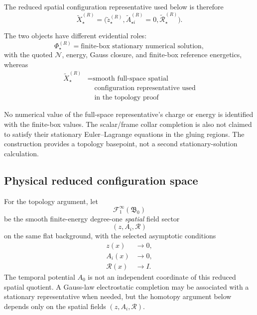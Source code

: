 \documentclass[11pt]{article}
\begin{document}
The reduced spatial configuration representative used below is therefore
\begin{equation}
\boxed{
\widetilde X_\star^{(R)}
=
\bigl(
\widetilde z_\star^{(R)},
\widetilde A_{\star i}^{(R)}=0,
\widetilde{\mathcal R}_\star^{(R)}
\bigr).
}
\end{equation}

The two objects have different evidential roles:
\begin{equation}
\boxed{
\Phi_\star^{(R)}
=
\text{finite-box stationary numerical solution},
}
\end{equation}
with the quoted \(\mathcal N\), energy, Gauss closure, and finite-box reference energetics, whereas
\begin{equation}
\boxed{
\begin{aligned}
\widetilde X_\star^{(R)}
&=\text{smooth full-space spatial}
\\
&\quad\text{configuration representative used}
\\
&\quad\text{in the topology proof}
\end{aligned}
}
\end{equation}

No numerical value of the full-space representative's charge or energy is identified with the finite-box values. The scalar/frame collar completion is also not claimed to satisfy their stationary Euler--Lagrange equations in the gluing regions. The construction provides a topology basepoint, not a second stationary-solution calculation.

\subsection{Physical reduced configuration space}

For the topology argument, let
\begin{equation}
\mathscr F_1^\infty(\mathfrak B_0)
\end{equation}
be the smooth finite-energy degree-one \emph{spatial} field sector
\begin{equation}
(z,A_i,\mathcal R)
\end{equation}
on the same flat background, with the selected asymptotic conditions
\begin{align}
z(x)&\to0,\\
A_i(x)&\to0,\\
\mathcal R(x)&\to I.
\end{align}
The temporal potential \(A_0\) is not an independent coordinate of this reduced spatial quotient. A Gauss-law electrostatic completion may be associated with a stationary representative when needed, but the homotopy argument below depends only on the spatial fields \((z,A_i,\mathcal R)\).
\end{document}
